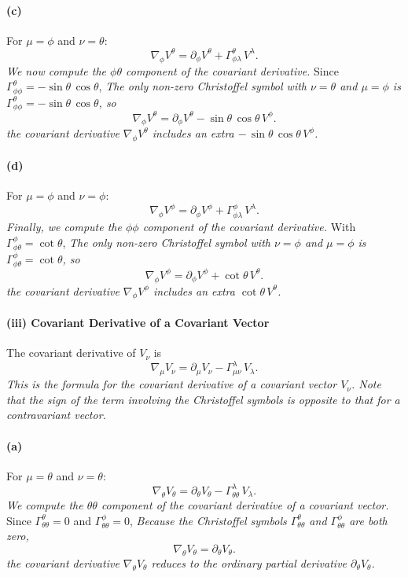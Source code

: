 \paragraph{(c)} For \(\mu = \phi\) and \(\nu = \theta\):
\[
\nabla_{\phi} V^\theta
=
\partial_\phi V^\theta
+
\Gamma^\theta_{\phi\lambda}\,V^\lambda.
\]
\emph{We now compute the \(\phi\theta\) component of the covariant derivative.}
Since \(\Gamma^\theta_{\phi\phi} = -\sin\theta\,\cos\theta\),
\emph{The only non-zero Christoffel symbol with \(\nu = \theta\) and \(\mu = \phi\) is \(\Gamma^\theta_{\phi\phi} = -\sin\theta\,\cos\theta\), so}
\[
\nabla_{\phi} V^\theta
=
\partial_\phi V^\theta
-
\sin\theta\,\cos\theta \, V^\phi.
\]
\emph{the covariant derivative \(\nabla_{\phi} V^\theta\) includes an extra \(-\,\sin\theta\,\cos\theta \, V^\phi\).}

\paragraph{(d)} For \(\mu = \phi\) and \(\nu = \phi\):
\[
\nabla_{\phi} V^\phi
=
\partial_\phi V^\phi
+
\Gamma^\phi_{\phi\lambda}\,V^\lambda.
\]
\emph{Finally, we compute the \(\phi\phi\) component of the covariant derivative.}
With \(\Gamma^\phi_{\phi\theta} = \cot\theta\),
\emph{The only non-zero Christoffel symbol with \(\nu = \phi\) and \(\mu = \phi\) is \(\Gamma^\phi_{\phi\theta} = \cot\theta\), so}
\[
\nabla_{\phi} V^\phi
=
\partial_\phi V^\phi
+
\cot\theta \, V^\theta.
\]
\emph{the covariant derivative \(\nabla_{\phi} V^\phi\) includes an extra \(\cot\theta \, V^\theta\).}

\paragraph*{(iii) Covariant Derivative of a Covariant Vector}
The covariant derivative of \(V_\nu\) is
\[
\nabla_\mu V_\nu
=
\partial_\mu V_\nu
-
\Gamma^\lambda_{\mu\nu}\,V_\lambda.
\]
\emph{This is the formula for the covariant derivative of a covariant vector \(V_\nu\). Note that the sign of the term involving the Christoffel symbols is opposite to that for a contravariant vector.}

\paragraph{(a)} For \(\mu = \theta\) and \(\nu = \theta\):
\[
\nabla_{\theta} V_\theta
=
\partial_\theta V_\theta
-
\Gamma^\lambda_{\theta\theta}\,V_\lambda.
\]
\emph{We compute the \(\theta\theta\) component of the covariant derivative of a covariant vector.}
Since \(\Gamma^\theta_{\theta\theta} = 0\) and \(\Gamma^\phi_{\theta\theta} = 0\),
\emph{Because the Christoffel symbols \(\Gamma^\theta_{\theta\theta}\) and \(\Gamma^\phi_{\theta\theta}\) are both zero,}
\[
\nabla_{\theta} V_\theta
=
\partial_\theta V_\theta.
\]
\emph{the covariant derivative \(\nabla_{\theta} V_\theta\) reduces to the ordinary partial derivative \(\partial_\theta V_\theta\).}

